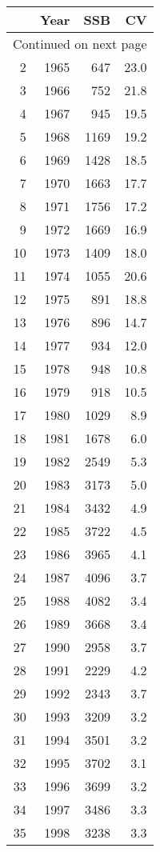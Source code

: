 \documentclass[]{article}
\begin{document}
\begin{longtable}{rrrr}
  \hline
 & Year & SSB & CV \\ 
  \hline
\endhead
\hline
\multicolumn{4}{l}{\footnotesize Continued on next page}
\endfoot
\endlastfoot
1 & 1964 & 546 & 27.4 \\ 
  2 & 1965 & 647 & 23.0 \\ 
  3 & 1966 & 752 & 21.8 \\ 
  4 & 1967 & 945 & 19.5 \\ 
  5 & 1968 & 1169 & 19.2 \\ 
  6 & 1969 & 1428 & 18.5 \\ 
  7 & 1970 & 1663 & 17.7 \\ 
  8 & 1971 & 1756 & 17.2 \\ 
  9 & 1972 & 1669 & 16.9 \\ 
  10 & 1973 & 1409 & 18.0 \\ 
  11 & 1974 & 1055 & 20.6 \\ 
  12 & 1975 & 891 & 18.8 \\ 
  13 & 1976 & 896 & 14.7 \\ 
  14 & 1977 & 934 & 12.0 \\ 
  15 & 1978 & 948 & 10.8 \\ 
  16 & 1979 & 918 & 10.5 \\ 
  17 & 1980 & 1029 & 8.9 \\ 
  18 & 1981 & 1678 & 6.0 \\ 
  19 & 1982 & 2549 & 5.3 \\ 
  20 & 1983 & 3173 & 5.0 \\ 
  21 & 1984 & 3432 & 4.9 \\ 
  22 & 1985 & 3722 & 4.5 \\ 
  23 & 1986 & 3965 & 4.1 \\ 
  24 & 1987 & 4096 & 3.7 \\ 
  25 & 1988 & 4082 & 3.4 \\ 
  26 & 1989 & 3668 & 3.4 \\ 
  27 & 1990 & 2958 & 3.7 \\ 
  28 & 1991 & 2229 & 4.2 \\ 
  29 & 1992 & 2343 & 3.7 \\ 
  30 & 1993 & 3209 & 3.2 \\ 
  31 & 1994 & 3501 & 3.2 \\ 
  32 & 1995 & 3702 & 3.1 \\ 
  33 & 1996 & 3699 & 3.2 \\ 
  34 & 1997 & 3486 & 3.3 \\ 
  35 & 1998 & 3238 & 3.3 \\ 

\end{longtable}
\end{document}
